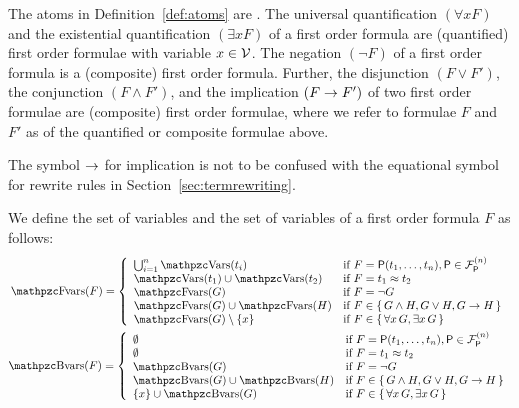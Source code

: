 
\begin{definition}[\FOF]\label{def:syntax:FOF}
	The atoms in Definition~\vref{def:atoms} are .
	The universal quantification \( (\forall x F) \)
	and the existential quantification \( (\exists x F) \)
	of a first order formula are (quantified) first order formulae
	with  variable \( x\in\mathcal{V} \).
	The negation \( (\lnot F) \) of a first order formula
	is a (composite) first order formula.
	Further, the disjunction \( (F \lor F') \),
	the conjunction \( (F \land F')  \),
	and the implication \( (F \rightarrow F') \)
	of two first order formulae
	are (composite) first order formulae, where 
%
	we refer to formulae \(F \) and \( F' \) as  of
	the quantified or composite formulae above.
\end{definition}

\begin{remark}
	The symbol \( \rightarrow \) for implication is not to be confused
	with the equational symbol for rewrite rules in Section~\ref{sec:termrewriting}.
\end{remark}

\begin{definition}\label{def:fof:fvars}\label{def:fof:bvars}
	We define the set of  variables and the set of  variables
	of a first order formula \( F \) as follows:
\begin{gather*}
	\MDEFINE{\fvar(F)}{ll}{
		\bigcup_{i=1}^n \var(t_i)
		&\text{if }F
		= \mP(t_1,\ldots,t_n), \mP\in\mcFPn
		\\
		\var(t_1)\cup\var(t_2)
		&\text{if }F
		= t_1\mEQ t_2
		\\
		\fvar(G)&\text{if }F = \lnot G
		\\
		\fvar(G) \cup \fvar(H)&\text{if }F \in \{ \, G\land H,G \lor H,G\limp H \, \}
		\\
		\fvar (G) \setminus \{ x\} &\text{if } F \in \{ \, \forall x \, G, \exists x \, G \, \}
	}
	\\
\MDEFINE{\bvar(F)}{ll}{
	\emptyset &\text{if }F = \mP(t_1,\ldots,t_n), \mP\in\mcFPn
	\\
	\emptyset &\text{if }F = t_1\mEQ t_2
	\\
	\bvar(G)&\text{if }F = \lnot G
	\\
	\bvar(G) \cup \bvar(H)&\text{if }F \in \{ \, G \land H, G \lor H, G \limp H \, \}
	\\
	\{ x\} \cup \bvar (G) &\text{if } F \in \{ \, \forall x \, G, \exists x\,G \, \}
}
\end{gather*}
\end{definition}


